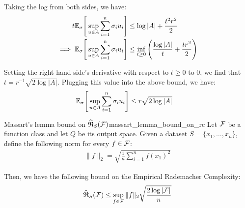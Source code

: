 \begin{proof*}
    \noindent Taking the log from both sides, we have:
    \begin{align*}
        t\mathbb{E}_\sigma\Bigg[ 
            \sup_{u\in A} \sum_{i=1}^n \sigma_i u_i
         \Bigg] &\le \log|A| + \frac{t^2r^2}{2} \\
        \implies \mathbb{E}_\sigma\Bigg[ 
            \sup_{u\in A} \sum_{i=1}^n \sigma_i u_i
         \Bigg] &\le \inf_{t\ge0} \Bigg( 
            \frac{\log|A|}{t} + \frac{tr^2}{2}
         \Bigg)
    \end{align*}

    \noindent Setting the right hand side's derivative with respect to $t\ge0$ to $0$, we find that $t = r^{-1}\sqrt{2\log|A|}$. Plugging this value into the above bound, we have:
    \begin{align*}
        \mathbb{E}_\sigma\Bigg[ 
            \sup_{u\in A} \sum_{i=1}^n \sigma_i u_i
         \Bigg] &\le r\sqrt{2\log|A|}
    \end{align*}
\end{proof*}

\begin{corollary}{Massart's lemma bound on $\widehat{\mathfrak{R}}_S(\mathcal{F})$}{massart_lemma_bound_on_rc}
    Let $\mathcal{F}$ be a function class and let $Q$ be its output space. Given a dataset $S=\{x_1, \dots, x_n\}$, define the following norm for every $f\in\mathcal{F}$:
    \begin{align*}
        \|f\|_2 = \sqrt{
            \frac{1}{n}\sum_{i=1}^n f(x_1)^2
        }
    \end{align*}

    \noindent Then, we have the following bound on the Empirical Rademacher Complexity:
    \begin{align*}
        \widehat{\mathfrak{R}}_S(\mathcal{F}) \le \sup_{f\in\mathcal{F}}\|f\|_2 \sqrt{
            \frac{2\log|\mathcal{F}|}{n}
        }
    \end{align*}
\end{corollary}

